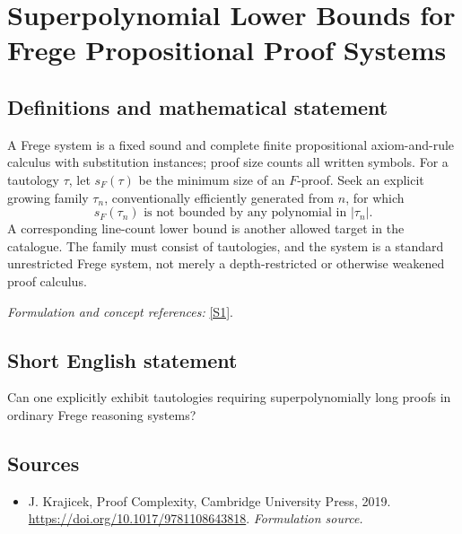 \documentclass[11pt]{article}
\begin{document}
\section*{\texorpdfstring{Superpolynomial Lower Bounds for Frege Propositional Proof Systems}{Superpolynomial Lower Bounds for Frege Propositional Proof Systems}}\label{104}
\subsection{Definitions and mathematical statement}
A Frege system is a fixed sound and complete finite propositional axiom-and-rule calculus with substitution instances; proof size counts all written symbols. For a tautology $\tau$, let $s_F(\tau)$ be the minimum size of an $F$-proof. Seek an explicit growing family $\tau_n$, conventionally efficiently generated from $n$, for which
\[
 s_F(\tau_n)\text{ is not bounded by any polynomial in }|\tau_n|.
\]
A corresponding line-count lower bound is another allowed target in the catalogue. The family must consist of tautologies, and the system is a standard unrestricted Frege system, not merely a depth-restricted or otherwise weakened proof calculus.
\par\smallskip\textit{Formulation and concept references:} \href{https://doi.org/10.1017/9781108643818}{[S1]}.

\subsection{Short English statement}
Can one explicitly exhibit tautologies requiring superpolynomially long proofs in ordinary Frege reasoning systems?
\subsection{Sources}
\begin{itemize}
\item[S1]J. Krajicek, Proof Complexity, Cambridge University Press, 2019.
\url{https://doi.org/10.1017/9781108643818}.
\textit{Formulation source.}
\end{itemize}
\end{document}
